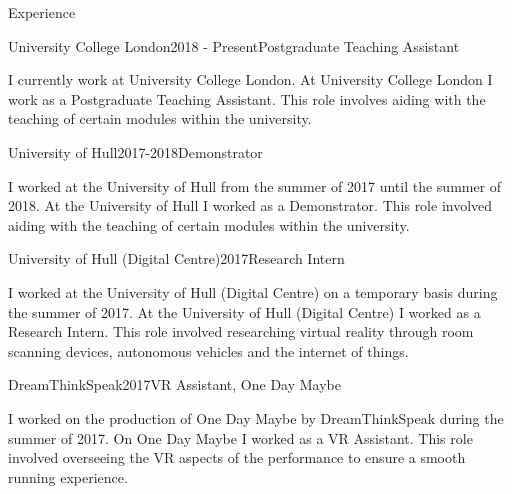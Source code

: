 \documentclass{cv}
\begin{document}
\begin{rSection}{Experience}

\begin{rSubsection}{University College London}{2018 - Present}{Postgraduate Teaching Assistant}{}

\item I currently work at University College London. At University College London I work as a Postgraduate Teaching Assistant. This role involves aiding with the teaching of certain modules within the university.

\end{rSubsection}


\begin{rSubsection}{University of Hull}{2017-2018}{Demonstrator}{}

\item I worked at the University of Hull from the summer of 2017 until the summer of 2018. At the University of Hull I worked as a Demonstrator. This role involved aiding with the teaching of certain modules within the university.

\end{rSubsection}


\begin{rSubsection}{University of Hull (Digital Centre)}{2017}{Research Intern}{}

\item I worked at the University of Hull (Digital Centre) on a temporary basis during the summer of 2017. At the University of Hull (Digital Centre) I worked as a Research Intern. This role involved researching virtual reality through room scanning devices, autonomous vehicles and the internet of things.

\end{rSubsection}


\begin{rSubsection}{DreamThinkSpeak}{2017}{VR Assistant, One Day Maybe}{}

\item I worked on the production of One Day Maybe by DreamThinkSpeak during the summer of 2017. On One Day Maybe I worked as a VR Assistant. This role involved overseeing the VR aspects of the performance to ensure a smooth running experience.

\end{rSubsection}

\end{rSection}
\end{document}
